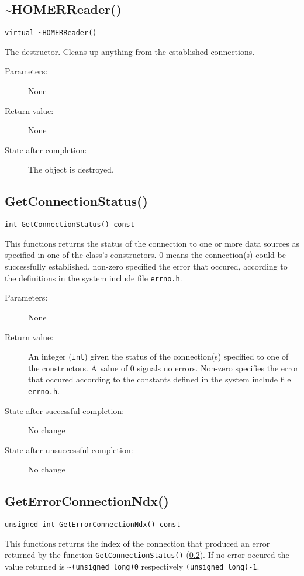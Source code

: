 \documentclass[a4paper,twoside]{article}
\begin{document}
\subsection{\~{ }HOMERReader()}

\texttt{virtual \~{ }HOMERReader()}

The destructor. Cleans up anything from the established connections.

\begin{description}
\item[Parameters:] None
\item[Return value:] None
\item[State after completion:] The object is destroyed.
\end{description}


\subsection{GetConnectionStatus()}
\label{Subsec:HOMERReader::GetConnectionStatus}
\texttt{int GetConnectionStatus() const}

This functions returns the status of the connection to one or more data sources as specified in one of the class's constructors. 0 means the connection(s)
could be successfully established, non-zero specified the error that occured, according to the definitions in the system include file \texttt{errno.h}.

\begin{description}
\item[Parameters:] None
\item[Return value:] An integer (\texttt{int}) given the status of the connection(s) specified to one of the constructors. A value of 0 signals no errors.
Non-zero specifies the error that occured according to the constants defined in the system include file \texttt{errno.h}.
\item[State after successful completion:] No change
\item[State after unsuccessful completion:] No change
\end{description}


\subsection{GetErrorConnectionNdx()}

\texttt{unsigned int GetErrorConnectionNdx() const}

This functions returns the index of the connection that produced an error returned by the function \texttt{GetConnectionStatus()}
(\ref{Subsec:HOMERReader::GetConnectionStatus}). If no error occured the value returned is \texttt{\~{ }(unsigned long)0} respectively \texttt{(unsigned long)-1}.
\end{document}
